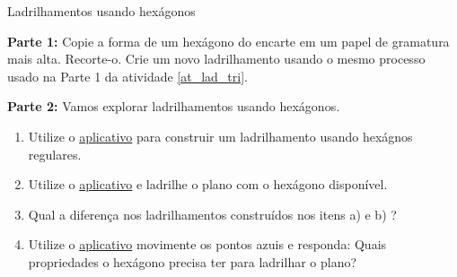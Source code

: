 \begin{task}{Ladrilhamentos usando hexágonos} \label{lad_hex}

\textbf{Parte 1:} Copie a forma de  um hexágono do encarte em um papel de gramatura mais alta. Recorte-o. Crie um novo ladrilhamento usando o mesmo processo usado na Parte 1 da atividade \ref{at_lad_tri}. 

\textbf{Parte 2:} Vamos explorar  ladrilhamentos  usando  hexágonos. 
\begin{enumerate}

\item Utilize o  \href{https://www.geogebra.org/m/uqemfkhp#material/zfczbshq}{aplicativo} para construir um ladrilhamento usando hexágnos regulares.
\item Utilize o  \href{https://www.geogebra.org/m/uqemfkhp#material/pnhc6tep}{aplicativo} e ladrilhe o plano com o hexágono disponível.
\item Qual a diferença nos ladrilhamentos construídos nos itens a) e b) ?

\item Utilize o \href{https://www.geogebra.org/m/uqemfkhp#material/ub84tqyy}{aplicativo} movimente os pontos azuis e responda: Quais propriedades o hexágono precisa ter para ladrilhar o plano?

\end{enumerate}
\end{task}




